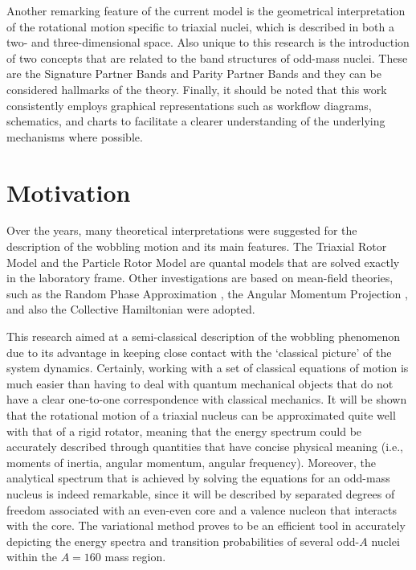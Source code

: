 Another remarking feature of the current model is the geometrical interpretation of the rotational motion specific to triaxial nuclei, which is described in both a two- and three-dimensional space. Also unique to this research is the introduction of two concepts that are related to the band structures of odd-mass nuclei. These are the Signature Partner Bands and Parity Partner Bands and they can be considered hallmarks of the theory. Finally, it should be noted that this work consistently employs graphical representations such as workflow diagrams, schematics, and charts to facilitate a clearer understanding of the underlying mechanisms where possible.

\section{Motivation}

Over the years, many theoretical interpretations were suggested for the description of the wobbling motion and its main features. The Triaxial Rotor Model \cite{bohr1998nuclear,davydov1958rotational} and the Particle Rotor Model \cite{hamamoto2002wobbling} are quantal models that are solved exactly in the laboratory frame. Other investigations are based on mean-field theories, such as the Random Phase Approximation \cite{shimizu1995nuclear}, the Angular Momentum Projection \cite{oi2000wobbling}, and also the Collective Hamiltonian \cite{chen2014collective} were adopted.

This research aimed at a semi-classical description of the wobbling phenomenon due to its advantage in keeping close contact with the `classical picture' of the system dynamics. Certainly, working with a set of classical equations of motion is much easier than having to deal with quantum mechanical objects that do not have a clear one-to-one correspondence with classical mechanics. It will be shown that the rotational motion of a triaxial nucleus can be approximated quite well with that of a rigid rotator, meaning that the energy spectrum could be accurately described through quantities that have concise physical meaning (i.e., moments of inertia, angular momentum, angular frequency). Moreover, the analytical spectrum that is achieved by solving the equations for an odd-mass nucleus is indeed remarkable, since it will be described by separated degrees of freedom associated with an even-even core and a valence nucleon that interacts with the core. The variational method proves to be an efficient tool in accurately depicting the energy spectra and transition probabilities of several odd-$A$ nuclei within the $A=160$ mass region.

